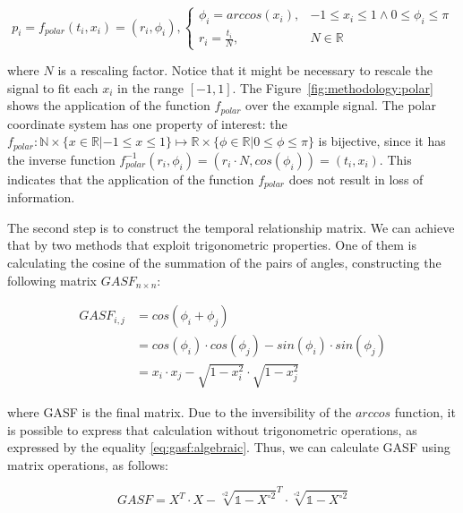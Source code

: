 \begin{equation}
    p_i = f_{polar}(t_i, x_i) = (r_i, \phi_i),    
    \begin{cases} 
        \phi_i = arccos(x_i), & -1 \leq x_i \leq 1 \wedge 0 \leq \phi_i \leq \pi\\
        r_i = \frac{t_i}{N},     & N \in \mathbb{R}
    \end{cases}
\end{equation}    

\noindent where $N$ is a rescaling factor. Notice that it might be necessary to rescale the signal to fit each $x_i$ in the range $[-1,1]$. The Figure~\ref{fig:methodology:polar} shows the application of the function $f_{polar}$ over the example signal. The polar coordinate system has one property of interest: the $f_{polar}: \mathbb{N} \times \{x \in \mathbb{R}| -1 \leq x \leq 1\} \mapsto \mathbb{R} \times \{\phi \in \mathbb{R}| 0 \leq \phi \leq \pi \}$ is bijective, since it has the inverse function $f_{polar}^{-1}(r_i, \phi_i)=(r_i \cdot N, cos(\phi_i))=(t_i,x_i)$. This indicates that the application of the function $f_{polar}$ does not result in loss of information.



The second step is to construct the temporal relationship matrix. We can achieve that by two methods that exploit trigonometric properties. One of them is calculating the cosine of the summation of the pairs of angles, constructing the following matrix $GASF_{n \times n}$:

\begin{align}
    GASF_{i,j}     & = cos(\phi_i + \phi_j) \\
            & = cos(\phi_i) \cdot cos(\phi_j) - sin(\phi_i) \cdot sin(\phi_j) \\
            & = x_i \cdot x_j - \sqrt{1 - x_i^2} \cdot \sqrt{1 - x_j^2} \label{eq:gasf:algebraic}
\end{align}

\noindent where \gls{GASF} is the final matrix. Due to the inversibility of the $arccos$ function, it is possible to express that calculation without trigonometric operations, as expressed by the equality \ref{eq:gasf:algebraic}. Thus, we can calculate \gls{GASF} using matrix operations, as follows:  

\begin{equation}
    GASF = X^T \cdot X - \sqrt[\circ 2]{\mathds{1}-X^{\circ 2}}^T \cdot \sqrt[\circ 2]{\mathds{1}-X^{\circ 2}}
\end{equation}

